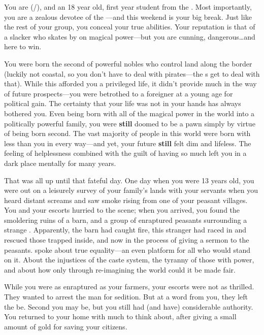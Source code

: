 \documentclass[char]{GL2020}
\begin{document}
\name{\cChupStudent{}}
 
You are \cChupStudent{\full} (\cChupStudent{\they}/\cChupStudent{\them}), and an 18 year old, first year student from the \pFarm{}. Most importantly, you are a zealous devotee of the \pGoaties{}---and this weekend is your big break. Just like the rest of your group, you conceal your true abilities. Your reputation is that of a slacker who skates by on \cChupStudent{\their} magical power---but you are cunning, dangerous\ldots{}and here to win.
 
You were born the second \cChupStudent{\child} of powerful nobles who control land along the \pTech{} border (luckily not coastal, so you don't have to deal with pirates---the \cWildCard{\formal}s get to deal with that). While this afforded you a privileged life, it didn't provide much in the way of future prospects---you were betrothed to a foreigner at a young age for political gain. The certainty that your life was not in your hands has always bothered you. Even being born with all of the magical power in the world into a politically powerful family, you were \textbf{still} doomed to be a pawn simply by virtue of being born second. The vast majority of people in this world were born with less than you in every way---and yet, your future \textbf{still} felt dim and lifeless. The feeling of helplessness combined with the guilt of having so much left you in a dark place mentally for many years.
 
That was all up until that fateful day. One day when you were 13 years old, you were out on a leisurely survey of your family's lands with your servants when you heard distant screams and saw smoke rising from one of your peasant villages. You and your escorts hurried to the scene; when you arrived, you found the smoldering ruins of a barn, and a group of enraptured peasants surrounding a strange \cChupLeader{\person}. Apparently, the barn had caught fire, this stranger had raced in and rescued those trapped inside, and \cChupLeader{\they} \cChupLeader{\were} now in the process of giving a sermon to the peasants. \cChupLeader{\They} spoke about true equality---an even platform for all who would stand on it. About the injustices of the caste system, the tyranny of those with power, and about how only through re-imagining the world could it be made fair. 
 
While you were as enraptured as your farmers, your escorts were not as thrilled. They wanted to arrest the man for sedition. But at a word from you, they left the \cChupLeader{\person} be. Second \cChupStudent{\child} you may be, but you still had (and have) considerable authority. You returned to your home with much to think about, after giving \cChupLeader{\them} a small amount of gold for saving your citizens.
 
\end{document}
